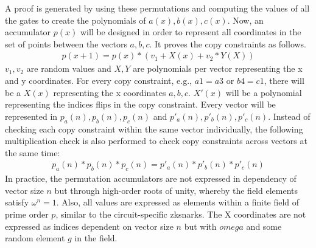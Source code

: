 A proof is generated by using these permutations and computing the values of all the gates to create the polynomials of \(a(x), b(x), c(x)\). Now, an accumulator \(p(x)\) will be designed in order to represent all coordinates in the set of points between the vectors \(a, b, c\). It proves the copy constraints as follows.
\begin{align}
    p(x+1) = p(x) * (v_1 + X(x) + v_2 * Y(X))
\end{align}
\(v_1, v_2\) are random values and \(X, Y\) are polynomials per vector representing the x and y coordinates. For every copy constraint, e.g., \(a1=a3\) or \(b4=c1\), there will be a \(X(x)\) representing the x coordinates \(a,b, c\). \(X'(x)\) will be a polynomial representing the indices flips in the copy constraint. Every vector will be represented in \(p_{a}(n), p_{b}(n), p_{c}(n)\) and \(p'_{a}(n), p'_{b}(n), p'_{c}(n)\). Instead of checking each copy constraint within the same vector individually, the following multiplication check is also performed to check copy constraints across vectors at the same time:
\begin{align}
    p_{a}(n) * p_{b}(n) * p_{c}(n) = p'_{a}(n) * p'_{b}(n) * p'_{c}(n)
\end{align}
In practice, the permutation accumulators are not expressed in dependency of vector size \(n\) but through high-order roots of unity, whereby the field elements satisfy \(\omega^n = 1\). Also, all values are expressed as elements within a finite field of prime order \(p\), similar to the circuit-specific \acrshort{zksnark}s. The X coordinates are not expressed as indices dependent on vector size \(n\) but with \(omega\) and some random element \(g\) in the field.
